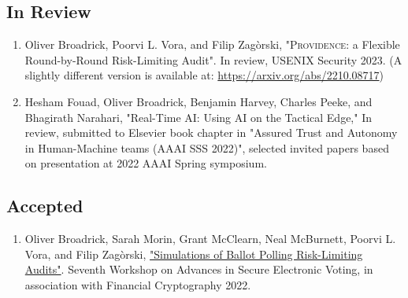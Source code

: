 \documentclass[letterpaper]{article}
\begin{document}
\subsection*{In Review}
\begin{enumerate}
\item
Oliver Broadrick, Poorvi L. Vora, and Filip Zag\`{o}rski, "\textsc{Providence}: a Flexible Round-by-Round Risk-Limiting Audit". In review, USENIX Security 2023. (A slightly different version is available at: \newline \href{https://arxiv.org/abs/2210.08717}{https://arxiv.org/abs/2210.08717})
\item
Hesham Fouad, Oliver Broadrick, Benjamin Harvey, Charles Peeke, and Bhagirath Narahari, "Real-Time AI: Using AI on the Tactical Edge," In review, submitted to Elsevier book chapter in "Assured Trust and Autonomy in Human-Machine teams (AAAI SSS 2022)", selected invited papers based on presentation at 2022 AAAI Spring symposium.
\end{enumerate}

\subsection*{Accepted}
\begin{enumerate}
\item Oliver Broadrick, Sarah Morin, Grant McClearn, Neal McBurnett, Poorvi L. Vora, and Filip Zag\`{o}rski, \href{https://oliverbroadrick.com/papers/simulations-of-ballot-polling-rlas.pdf}{"Simulations of Ballot Polling Risk-Limiting Audits"}. Seventh Workshop on Advances in Secure Electronic Voting, in association with Financial Cryptography 2022.
\end{enumerate}

\bigskip
\end{document}
